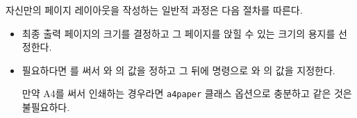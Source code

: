자신만의 페이지 레이아웃을 작성하는 일반적 과정은 다음 절차를 따른다.
\begin{itemize}
\item 최종 출력 페이지의 크기를 결정하고 그 페이지를 앉힐 수 있는 크기의 용지를 선정한다.
\item 필요하다면 \cmd{\setstocksize}를 써서 \lnc{\stockheight}와 \lnc{\stockwidth}의 값을 정하고 그 뒤에 \cmd{\settrimmedsize} 명령으로 \lnc{\paperheight}와 \lnc{\paperwidth}의 값을 지정한다.
  
만약 A4를 써서 인쇄하는 경우라면 \texttt{a4paper} 클래스 옵션으로 충분하고 \cmd{\setstocksize} 같은 것은 불필요하다.


\end{itemize}
